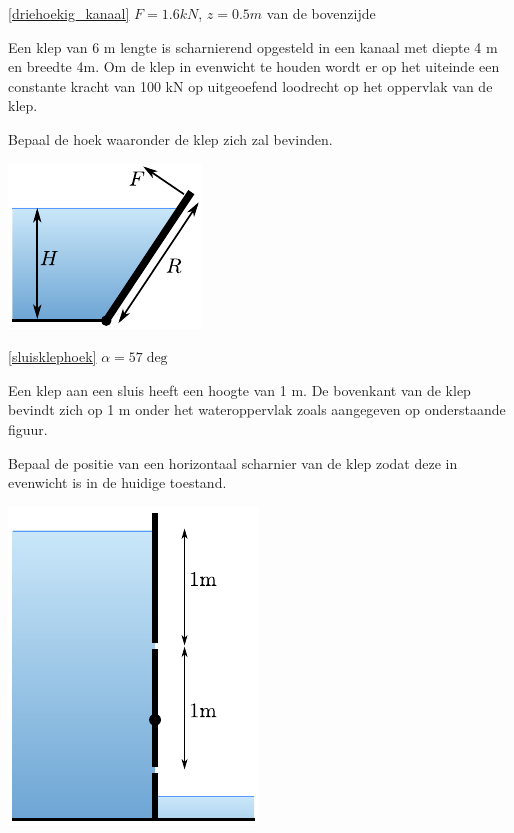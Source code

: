 \begin{antwoord}{\ref{driehoekig_kanaal}}
	$F = 1.6\unit{kN}$, $z=0.5\unit{m}$ van de bovenzijde
\end{antwoord}
\begin{toepassing}
	\label{sluisklephoek}
Een klep van 6 m lengte is scharnierend opgesteld in een kanaal met diepte 4 m en breedte 4m. Om de klep in evenwicht te houden wordt er op het uiteinde een constante kracht van 100 kN op uitgeoefend loodrecht op het oppervlak van de klep.
		
Bepaal de hoek waaronder de klep zich zal bevinden.

	\centering
	\includegraphics{fig/hydrostatica/sluisklephoek}
\end{toepassing}
\begin{antwoord}{\ref{sluisklephoek}}
	$\alpha = 57\deg$
\end{antwoord}	
\begin{toepassing}[*]
	\label{sluisklep}
Een klep aan een sluis heeft een hoogte van 1 m. De bovenkant van de klep bevindt zich op 1 m onder het wateroppervlak zoals aangegeven op onderstaande figuur.
		
Bepaal de positie van een horizontaal scharnier van de klep zodat deze in evenwicht is in de huidige toestand.

	\centering
	\includegraphics{fig/hydrostatica/sluisklep}
\end{toepassing}

